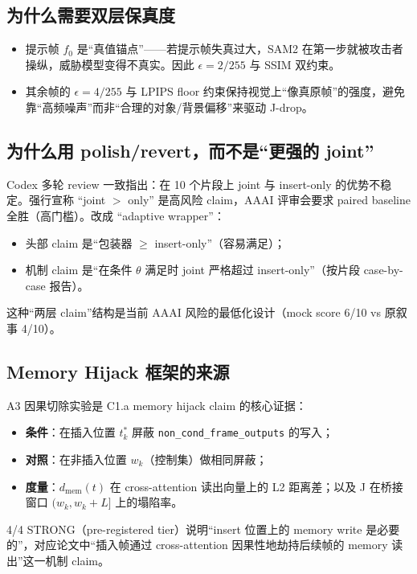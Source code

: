 \documentclass[11pt,a4paper]{ctexart}
\begin{document}
\subsection{为什么需要双层保真度}

\begin{itemize}[leftmargin=2em]
    \item 提示帧 $f_0$ 是``真值锚点''——若提示帧失真过大，SAM2 在第一步就被攻击者操纵，威胁模型变得不真实。因此 $\epsilon=2/255$ 与 SSIM 双约束。
    \item 其余帧的 $\epsilon=4/255$ 与 LPIPS floor 约束保持视觉上``像真原帧''的强度，避免靠``高频噪声''而非``合理的对象/背景偏移''来驱动 J-drop。
\end{itemize}

\subsection{为什么用 polish/revert，而不是``更强的 joint''}

Codex 多轮 review 一致指出：在 10 个片段上 joint 与 insert-only 的优势不稳定。强行宣称 ``joint $>$ only'' 是高风险 claim，AAAI 评审会要求 paired baseline 全胜（高门槛）。改成 ``adaptive wrapper''：
\begin{itemize}[leftmargin=2em]
    \item 头部 claim 是``包装器 $\geq$ insert-only''（容易满足）；
    \item 机制 claim 是``在条件 $\theta$ 满足时 joint 严格超过 insert-only''（按片段 case-by-case 报告）。
\end{itemize}
这种``两层 claim''结构是当前 AAAI 风险的最低化设计（mock score 6/10 vs 原叙事 4/10）。

\subsection{Memory Hijack 框架的来源}

A3 因果切除实验是 C1.a memory hijack claim 的核心证据：
\begin{itemize}[leftmargin=2em]
    \item \textbf{条件}：在插入位置 $t^*_k$ 屏蔽 \texttt{non\_cond\_frame\_outputs} 的写入；
    \item \textbf{对照}：在非插入位置 $w_k$（控制集）做相同屏蔽；
    \item \textbf{度量}：$d_{\text{mem}}(t)$ 在 cross-attention 读出向量上的 L2 距离差；以及 J 在桥接窗口 $(w_k, w_k+L]$ 上的塌陷率。
\end{itemize}
4/4 STRONG（pre-registered tier）说明``insert 位置上的 memory write 是必要的''，对应论文中``插入帧通过 cross-attention 因果性地劫持后续帧的 memory 读出''这一机制 claim。
\end{document}
